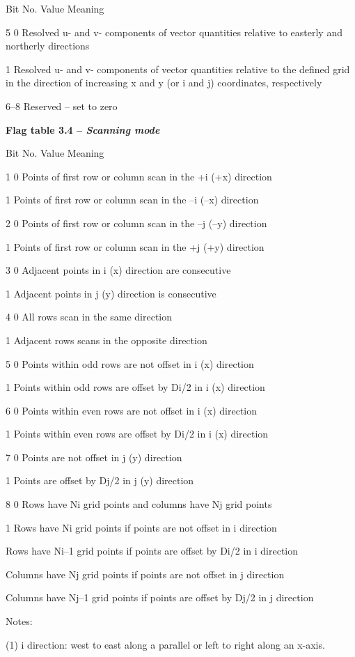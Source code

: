 Bit No. Value Meaning

5 0 Resolved u- and v- components of vector quantities relative to easterly and northerly directions

1 Resolved u- and v- components of vector quantities relative to the defined grid in the direction of increasing x and y (or i and j) coordinates, respectively

6--8 Reserved -- set to zero

\textbf{Flag table 3.4 -- \emph{Scanning mode}}

Bit No. Value Meaning

1 0 Points of first row or column scan in the +i (+x) direction

1 Points of first row or column scan in the --i (--x) direction

2 0 Points of first row or column scan in the --j (--y) direction

1 Points of first row or column scan in the +j (+y) direction

3 0 Adjacent points in i (x) direction are consecutive

1 Adjacent points in j (y) direction is consecutive

4 0 All rows scan in the same direction

1 Adjacent rows scans in the opposite direction

5 0 Points within odd rows are not offset in i (x) direction

1 Points within odd rows are offset by Di/2 in i (x) direction

6 0 Points within even rows are not offset in i (x) direction

1 Points within even rows are offset by Di/2 in i (x) direction

7 0 Points are not offset in j (y) direction

1 Points are offset by Dj/2 in j (y) direction

8 0 Rows have Ni grid points and columns have Nj grid points

1 Rows have Ni grid points if points are not offset in i direction

Rows have Ni--1 grid points if points are offset by Di/2 in i direction

Columns have Nj grid points if points are not offset in j direction

Columns have Nj--1 grid points if points are offset by Dj/2 in j direction

Notes:

(1) i direction: west to east along a parallel or left to right along an x-axis.

